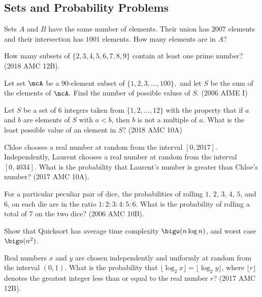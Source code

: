 \documentclass[11pt]{article}
\begin{document}
\subsection*{Sets and Probability Problems}
\begin{problem}[10]
    Sets $A$ and $B$ have the same number of elements. Their union has $2007$ elements and their intersection has $1001$ elements. How many elements are in $A$?
\end{problem}
\begin{problem}[10]
    How many subsets of $\{2,3,4,5,6,7,8,9\}$ contain at least one prime number? (2018 AMC 12B).
\end{problem}
\begin{problem}[25]
    Let set $\mcA$ be a 90-element subset of $\{1,2,3,\dots,100\},$ and let $S$ be the sum of the elements of $\mcA.$ Find the number of possible values of $S.$ (2006 AIME I)
\end{problem}
\begin{problem}[25]
    Let $S$ be a set of 6 integers taken from $\{1,2,\dots,12\}$ with the property that if $a$ and $b$ are elements of $S$ with $a<b$, then $b$ is not a multiple of $a$. What is the least possible value of an element in $S?$ (2018 AMC 10A)
\end{problem}
\begin{problem}[20]
    Chloe chooses a real number at random from the interval $[0, 2017]$. Independently, Laurent chooses a real number at random from the interval $[0, 4034]$. What is the probability that Laurent's number is greater than Chloe's number? (2017 AMC 10A).
\end{problem}
\begin{problem}[20]
    For a particular peculiar pair of dice, the probabilities of rolling $1$, $2$, $3$, $4$, $5$, and $6$, on each die are in the ratio $1:2:3:4:5:6$. What is the probability of rolling a total of $7$ on the two dice? (2006 AMC 10B).
\end{problem}
\begin{problem}[CS25]
    Show that Quicksort has average time complexity $\bigo(n\log n)$, and worst case $\bigo(n^2)$.
\end{problem}
\begin{problem}[35]
    Real numbers $x$ and $y$ are chosen independently and uniformly at random from the interval $(0,1)$. What is the probability that $\lfloor\log_2 x\rfloor=\lfloor\log_2 y\rfloor$, where $\lfloor r\rfloor$ denotes the greatest integer less than or equal to the real number $r$? (2017 AMC 12B).
\end{problem}
\end{document}
